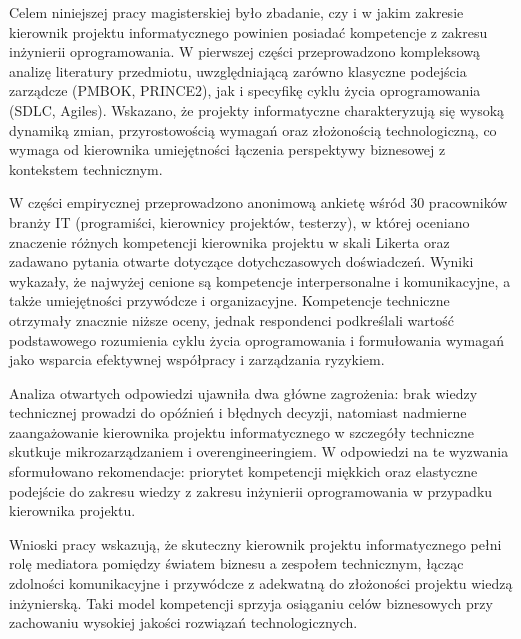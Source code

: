 \documentclass[
    left=2.5cm,         %
    right=2.5cm,        %
    top=2.5cm,          %
    bottom=3cm,         %
    bindingoffset=6mm,  %
    nohyphenation=false %
]{eiti/eiti-thesis}
\begin{document}
\listoffigurestoc     %
\vspace{1cm}          %
\listoftablestoc      %
\vspace{1cm}          %
\listofappendicestoc  %

\newpage %
\streszczenie

Celem niniejszej pracy magisterskiej było zbadanie, czy i w jakim zakresie kierownik projektu informatycznego powinien posiadać kompetencje z zakresu inżynierii oprogramowania. W pierwszej części przeprowadzono kompleksową analizę literatury przedmiotu, uwzględniającą zarówno klasyczne podejścia zarządcze (PMBOK, PRINCE2), jak i specyfikę cyklu życia oprogramowania (SDLC, Agiles). Wskazano, że projekty informatyczne charakteryzują się wysoką dynamiką zmian, przyrostowością wymagań oraz złożonością technologiczną, co wymaga od kierownika umiejętności łączenia perspektywy biznesowej z kontekstem technicznym.

W części empirycznej przeprowadzono anonimową ankietę wśród 30 pracowników branży IT (programiści, kierownicy projektów, testerzy), w której oceniano znaczenie różnych kompetencji kierownika projektu w skali Likerta oraz zadawano pytania otwarte dotyczące dotychczasowych doświadczeń. Wyniki wykazały, że najwyżej cenione są kompetencje interpersonalne i komunikacyjne, a także umiejętności przywódcze i organizacyjne. Kompetencje techniczne otrzymały znacznie niższe oceny, jednak respondenci podkreślali wartość podstawowego rozumienia cyklu życia oprogramowania i formułowania wymagań jako wsparcia efektywnej współpracy i zarządzania ryzykiem.

Analiza otwartych odpowiedzi ujawniła dwa główne zagrożenia: brak wiedzy technicznej prowadzi do opóźnień i błędnych decyzji, natomiast nadmierne zaangażowanie kierownika projektu informatycznego w szczegóły techniczne skutkuje mikrozarządzaniem i overengineeringiem. W odpowiedzi na te wyzwania sformułowano rekomendacje: priorytet kompetencji miękkich oraz elastyczne podejście do zakresu wiedzy z zakresu inżynierii oprogramowania w przypadku kierownika projektu.

Wnioski pracy wskazują, że skuteczny kierownik projektu informatycznego pełni rolę mediatora pomiędzy światem biznesu a zespołem technicznym, łącząc zdolności komunikacyjne i przywódcze z adekwatną do złożoności projektu wiedzą inżynierską. Taki model kompetencji sprzyja osiąganiu celów biznesowych przy zachowaniu wysokiej jakości rozwiązań technologicznych.

\end{document}
